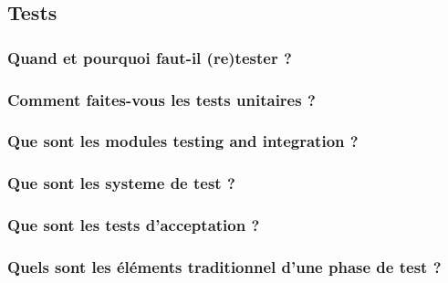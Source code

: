 \subsection{Tests}

\subsubsection{Quand et pourquoi faut-il (re)tester ?}
\subsubsection{Comment faites-vous les tests unitaires ?}
\subsubsection{Que sont les modules testing and integration ?}
\subsubsection{Que sont les systeme de test ?}
\subsubsection{Que sont les tests d'acceptation ?}
\subsubsection{Quels sont les éléments traditionnel d'une phase de test ?}